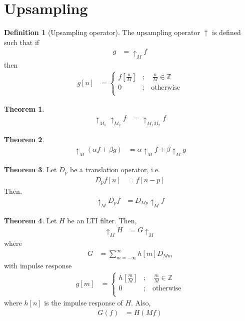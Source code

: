 \documentclass[titlepage, fleqn, a4paper, 12pt, twoside]{article}
\theoremstyle{definition}
\newtheorem{definition}{Definition}
\theoremstyle{theorem}
\newtheorem{theorem}{Theorem}
\def\upsample#1{\uparrow_{#1}}
\begin{document}
\section{Upsampling}

\begin{definition}[Upsampling operator]
	The upsampling operator $\uparrow$ is defined such that if
	\begin{align*}
		g &= \upsample{M} f
	\end{align*}
	then
	\begin{align*}
		g[n] &=
			\begin{cases}
				f\left[ \frac{n}{M} \right] &;\quad \frac{n}{M} \in \mathbb{Z}\\
				0 &;\quad \text{otherwise}\\
			\end{cases}
	\end{align*}
\end{definition}

\begin{theorem}
	\begin{align*}
		\upsample{M_1} \upsample{M_2} f &= \upsample{M_1 M_2} f
	\end{align*}
\end{theorem}

\begin{theorem}
	\begin{align*}
		\upsample{M} (\alpha f + \beta g) &= \alpha \upsample{M} f + \beta \upsample{M} g
	\end{align*}
\end{theorem}

\begin{theorem}
	Let $D_p$ be a translation operator, i.e.
	\begin{align*}
		D_p f[n] &= f[n - p]
	\end{align*}
	Then,
	\begin{align*}
		\upsample{M} D_p f &= D_{M p} \upsample{M} f
	\end{align*}
\end{theorem}

\begin{theorem}
	Let $H$ be an LTI filter.
	Then,
	\begin{align*}
		\upsample{M} H &= G \upsample{M}
	\end{align*}
	where
	\begin{align*}
		G &= \sum\limits_{m = -\infty}^{\infty} h[m] D_{M m}
	\end{align*}
	with impulse response
	\begin{align*}
		g[m] &=
			\begin{cases}
				h\left[ \frac{m}{M} \right] &;\quad \frac{m}{M} \in \mathbb{Z}\\
				0 &;\quad \text{otherwise}\\
			\end{cases}
	\end{align*}
	where $h[n]$ is the impulse response of $H$.
	Also,
	\begin{align*}
		G(f) &= H(M f)
	\end{align*}
\end{theorem}
\end{document}
